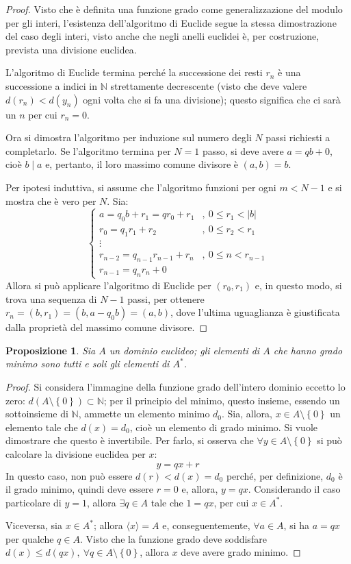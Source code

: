 \documentclass[12pt]{scrartcl}
\theoremstyle{style}
\newtheorem{prop}{Proposizione}[section]
\numberwithin{equation}{subsection}
\begin{document}
	\begin{proof}
		Visto che \`e definita una funzione grado come generalizzazione del modulo per gli interi, l'esistenza dell'algoritmo di Euclide segue la stessa dimostrazione del caso degli interi, visto anche che negli anelli euclidei \`e, per costruzione, prevista una divisione euclidea.

		L'algoritmo di Euclide termina perch\'e la successione dei resti $r_n$ \`e una successione a indici in $\mathbb{N}$ strettamente decrescente (visto che deve valere $d(r_n) < d(y_n)$ ogni volta che si fa una divisione); questo significa che ci sar\`a un $n$ per cui $r_n = 0$.

		Ora si dimostra l'algoritmo per induzione sul numero degli $N$ passi richiesti a completarlo.
		Se l'algoritmo termina per $N=1$ passo, si deve avere $a = qb + 0$, cio\`e $b \mid a$ e, pertanto, il loro massimo comune divisore \`e $(a,b) = b$.

		Per ipotesi induttiva, si assume che l'algoritmo funzioni per ogni $m < N-1$ e si mostra che \`e vero per $N$.
		Sia:
		\[
		\begin{cases}
			a = q_0b +r_1 = qr_0+r_1 &,\ 0\le r_1<\lvert b \rvert \\
			r_0 = q_1r_1 + r_2 &,\ 0\le r_2<r_1\\
			\vdots\\
			r_{n-2} =q_{n-1} r_{n-1} +r_n &,\ 0\le n < r_{n-1} \\
			r_{n-1} = q_nr_n + 0
		\end{cases}
		\] 
		Allora si pu\`o applicare l'algoritmo di Euclide per $(r_0,r_1)$ e, in questo modo, si trova una sequenza di $N-1$ passi, per ottenere $r _ n =(b,r_1)=(b,a-q_0b)=(a,b)$, dove l'ultima uguaglianza \`e giustificata dalla propriet\`a del massimo comune divisore.
	\end{proof}
\begin{prop}
	Sia $A$ un dominio euclideo; gli elementi di $A$ che hanno grado minimo sono tutti e soli gli elementi di $A^*$.
\end{prop}
	\begin{proof}
		Si considera l'immagine della funzione grado dell'intero dominio eccetto lo zero: $d ( A\setminus\left\{ 0 \right\} ) \subset \mathbb{N}$; per il principio del minimo, questo insieme, essendo un sottoinsieme di $\mathbb{N}$, ammette un elemento minimo $d_0$.
		Sia, allora, $x \in A\setminus\left\{ 0 \right\} $ un elemento tale che $d(x) = d_0$, cio\`e un elemento di grado minimo. 
		Si vuole dimostrare che questo \`e invertibile.
		Per farlo, si osserva che $\forall y \in A\setminus\left\{ 0 \right\} $ si pu\`o calcolare la divisione euclidea per $x$:
		\[
		 y = qx +r
		\] 
		In questo caso, non pu\`o essere $d(r) < d(x) = d_0$ perch\'e, per definizione, $d_0$ \`e il grado minimo, quindi deve essere $r= 0$ e, allora, $y= qx$.
		Considerando il caso particolare di $y = 1$, allora $\exists q \in A$ tale che $1 = qx$, per cui $x \in A^*$.

		Viceversa, sia $x \in A^*$; allora $\langle x \rangle = A$ e, conseguentemente, $\forall a \in A$, si ha $a=qx$ per qualche $ q \in A$.
		Visto che la funzione grado deve soddisfare $d(x) \le d(qx), \ \forall q \in A \setminus\left\{ 0 \right\} $, allora $x$ deve avere grado minimo.
	\end{proof}
\end{document}
